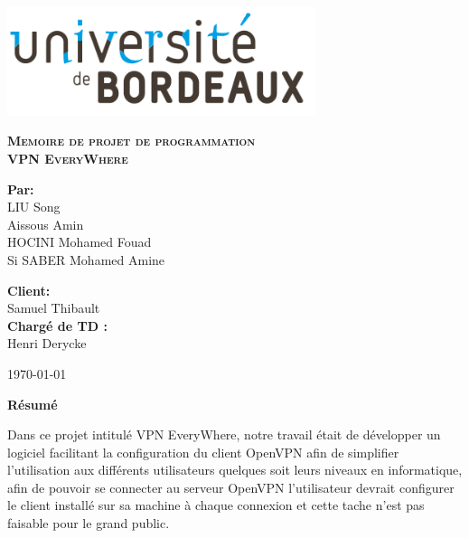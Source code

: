 \documentclass[12pt,a4paper]{article}
\begin{document}
\newpage

\begin{flushleft}
\Large\textbf{Résumé }
\end{flushleft}

Dans ce projet intitulé VPN EveryWhere, notre travail était de développer un logiciel facilitant la configuration du client OpenVPN afin de simplifier l'utilisation aux différents utilisateurs quelques soit leurs niveaux en informatique, afin de pouvoir se connecter au serveur OpenVPN l'utilisateur devrait configurer le client installé sur sa machine à chaque connexion et cette tache n'est pas faisable pour le grand public.\\
\end{document}
